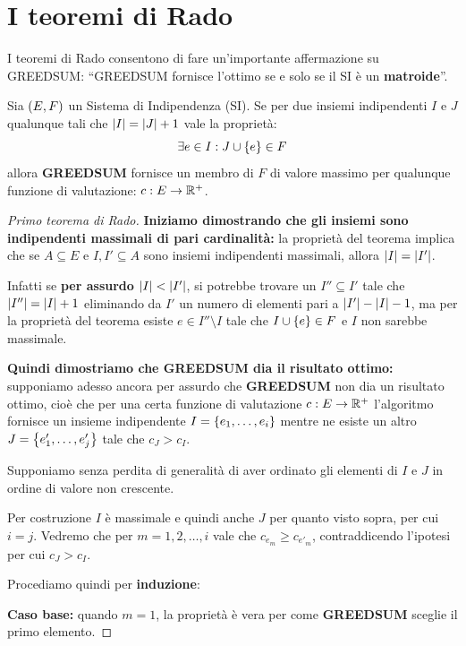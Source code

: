 \documentclass[\main/main.tex]{subfiles}
\begin{document}
\section{I teoremi di Rado}
I teoremi di Rado consentono di fare un'importante affermazione su GREEDSUM: ``GREEDSUM fornisce l'ottimo se e solo se il SI è un \textbf{matroide}''.
\begin{theorem}
  Sia \(\left(E, F\right)\) un Sistema di Indipendenza (SI). Se per due insiemi indipendenti \(I\) e \(J\) qualunque tali che \(\left\lvert I\right\rvert = \left\lvert J\right\rvert + 1\) vale la proprietà:
  \[
    \exists e \in I: J \cup \left\{e\right\} \in F
  \]
  allora \textbf{GREEDSUM} fornisce un membro di \(F\) di valore massimo per qualunque funzione di valutazione: \(c: E \rightarrow \mathbb{R}^+\).
  \label{primo_rado}
\end{theorem}
\begin{proof}[Primo teorema di Rado]
  \textbf{Iniziamo dimostrando che gli insiemi sono indipendenti massimali di pari cardinalità:} la proprietà del teorema implica che se \(A \subseteq E\) e \(I, I' \subseteq A\) sono insiemi indipendenti massimali, allora \(\left\lvert I\right\rvert = \left\lvert I'\right\rvert\).

  Infatti se \textbf{per assurdo} \(\left\lvert I\right\rvert < \left\lvert I'\right\rvert\), si potrebbe trovare un \(I'' \subseteq I'\) tale che \(\left\lvert I''\right\rvert = \left\lvert I\right\rvert + 1\) eliminando da \(I'\) un numero di elementi pari a \(\left\lvert I'\right\rvert - \left\lvert I\right\rvert - 1\), ma per la proprietà del teorema esiste \(e \in I'' \setminus I\) tale che \(I \cup \left\{e\right\} \in F\) e \(I\) non sarebbe massimale.

  \textbf{Quindi dimostriamo che GREEDSUM dia il risultato ottimo:} supponiamo adesso ancora per assurdo che \textbf{GREEDSUM} non dia un risultato ottimo, cioè che per una certa funzione di valutazione \(c: E \rightarrow \mathbb{R}^+\) l'algoritmo fornisce un insieme indipendente \(I = \left\{e_1, \ldots, e_i\right\}\) mentre ne esiste un altro \(J = \left\{e'_1, \ldots, e'_j\right\}\) tale che \(c_J > c_I\).

  Supponiamo senza perdita di generalità di aver ordinato gli elementi di \(I\) e \(J\) in ordine di valore non crescente.

  Per costruzione \(I\) è massimale e quindi anche \(J\) per quanto visto sopra, per cui \(i=j\). Vedremo che per \(m=1, 2, \ldots, i\) vale che \(c_{e_m} \geq c_{e'_m}\), contraddicendo l'ipotesi per cui \(c_J > c_I\).

  Procediamo quindi per \textbf{induzione}:

  \textbf{Caso base:} quando \(m=1\), la proprietà è vera per come \textbf{GREEDSUM} sceglie il primo elemento.


\end{proof}
\end{document}
